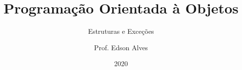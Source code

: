 \title{Programação Orientada à Objetos}
\subtitle{Estruturas e Exceções}
\date{2020}
\author{Prof. Edson Alves}
